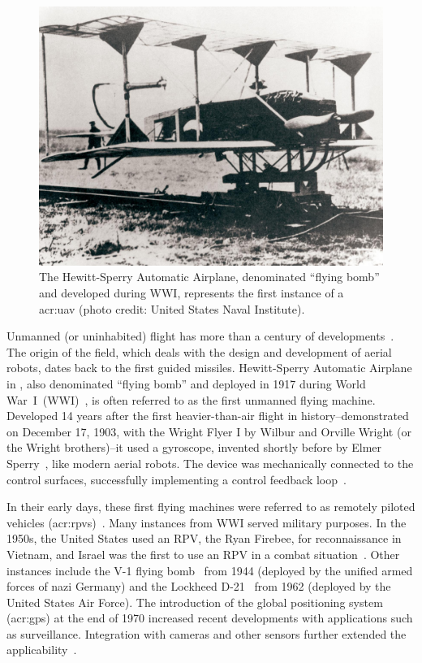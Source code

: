 \begin{figure}[t]
  \centering
  \includegraphics[width=.7\textwidth]{pictures/HA-NH-JA-19_1}
  \caption[Hewitt-Sperry Automatic Airplane, the first unmanned flying machine]{The Hewitt-Sperry Automatic Airplane, denominated ``flying bomb'' and developed during WWI, represents the first instance of a \Gls{acr:uav} {\scriptsize(photo credit: United States Naval Institute)}.}   
  \label{fig:hewitt-sperry}
\end{figure}
Unmanned (or uninhabited) flight has more than a century of developments~\citep{siciliano2016springer}. The origin of the field, which deals with the design and development of aerial robots, dates back to the first guided missiles. Hewitt-Sperry Automatic Airplane in , also denominated ``flying bomb'' and deployed in 1917 during World War~I~(WWI)~\citep{keane2013brief,valavanis2015handbook}, is often referred to as the first unmanned flying machine. Developed 14 years after the first heavier-than-air flight in history--demonstrated on December 17, 1903, with the Wright Flyer I by Wilbur and Orville Wright (or the Wright brothers)--it used a gyroscope, invented shortly before by Elmer Sperry~\citep{keane2013brief}, like modern aerial robots. The device was mechanically connected to the control surfaces, successfully implementing a control feedback loop~\citep{siciliano2016springer}.

In their early days, these first flying machines were referred to as remotely piloted vehicles (\Gls{acr:rpv}s)~\citep{anderson2005introduction}. Many instances from WWI served military purposes. In the 1950s, the United States used an RPV, the Ryan Firebee, for reconnaissance in Vietnam, and Israel was the first to use an RPV in a combat situation~\citep{anderson2005introduction}. Other instances include the V-1 flying bomb~ from 1944 (deployed by the unified armed forces of nazi Germany) and the Lockheed D-21~ from 1962 (deployed by the United States Air Force). The introduction of the global positioning system (\Gls{acr:gps}) at the end of 1970 increased recent developments with applications such as surveillance. Integration with cameras and other sensors further extended the applicability~\citep{siciliano2016springer}.%

